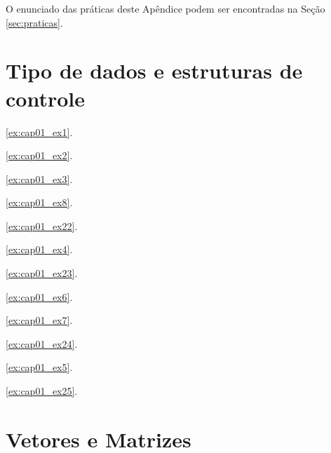 \label{appendix:src}

O enunciado das práticas deste Apêndice podem ser encontradas na Seção \ref{sec:praticas}.
\section{Tipo de dados e estruturas de controle}

\ref{ex:cap01_ex1}.


\ref{ex:cap01_ex2}.


\ref{ex:cap01_ex3}.


\ref{ex:cap01_ex8}.


\ref{ex:cap01_ex22}.


\ref{ex:cap01_ex4}.


\ref{ex:cap01_ex23}.


\ref{ex:cap01_ex6}.


\ref{ex:cap01_ex7}.


\ref{ex:cap01_ex24}.


\ref{ex:cap01_ex5}.


\ref{ex:cap01_ex25}.


\section{Vetores e Matrizes}

